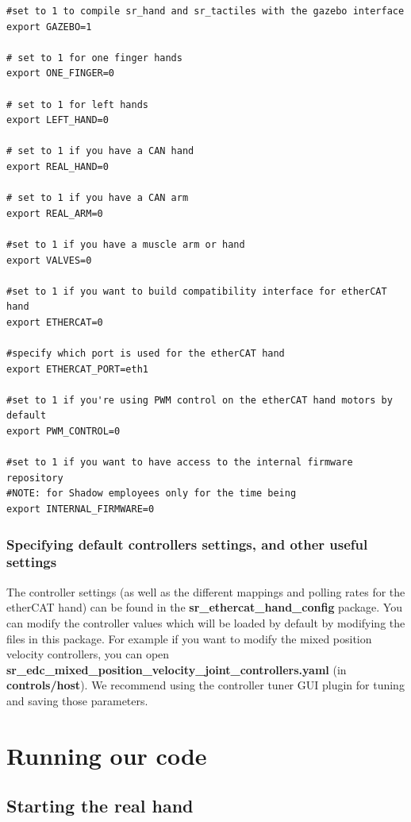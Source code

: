 \documentclass[12pt]{article}
\begin{document}
  \begin{lstlisting}[title={\textbf{env\_variables.bashrc}}, upquote=true]
#set to 1 to compile sr_hand and sr_tactiles with the gazebo interface
export GAZEBO=1

# set to 1 for one finger hands
export ONE_FINGER=0

# set to 1 for left hands
export LEFT_HAND=0

# set to 1 if you have a CAN hand
export REAL_HAND=0

# set to 1 if you have a CAN arm
export REAL_ARM=0

#set to 1 if you have a muscle arm or hand
export VALVES=0

#set to 1 if you want to build compatibility interface for etherCAT hand
export ETHERCAT=0

#specify which port is used for the etherCAT hand
export ETHERCAT_PORT=eth1

#set to 1 if you're using PWM control on the etherCAT hand motors by default
export PWM_CONTROL=0

#set to 1 if you want to have access to the internal firmware repository
#NOTE: for Shadow employees only for the time being
export INTERNAL_FIRMWARE=0
  \end{lstlisting}


\subsubsection{Specifying default controllers settings, and other useful settings}
\label{sec:spec-defa-contr}
\par The controller settings (as well as the different mappings and polling rates for the etherCAT hand) can be found in the \textbf{sr\_ethercat\_hand\_config} package. You can modify the controller values which will be loaded by default by modifying the files in this package. For example if you want to modify the mixed position velocity controllers, you can open \textbf{sr\_edc\_mixed\_position\_velocity\_joint\_controllers.yaml} (in \textbf{controls/host}). We recommend using the controller tuner GUI plugin for tuning and saving those parameters.

\newpage

\section{Running our code}
\label{sec:running-our-code}

\subsection{Starting the real hand}
\label{sec:starting-real-hand}
\end{document}
